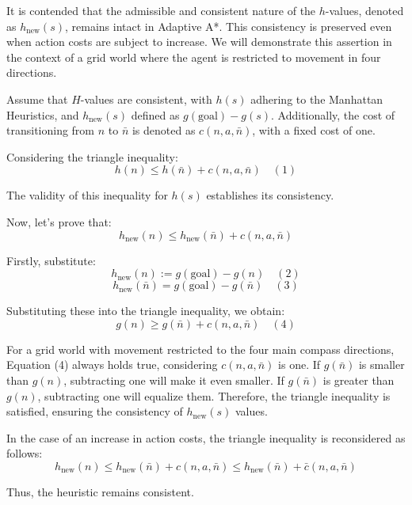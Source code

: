 It is contended that the admissible and consistent nature of the $h$-values, denoted as $h_{\text{new}}(s)$, remains intact in Adaptive A*. This consistency is preserved even when action costs are subject to increase. We will demonstrate this assertion in the context of a grid world where the agent is restricted to movement in four directions.

Assume that $H$-values are consistent, with $h(s)$ adhering to the Manhattan Heuristics, and $h_{\text{new}}(s)$ defined as $g(\text{goal}) - g(s)$. Additionally, the cost of transitioning from $n$ to $\bar{n}$ is denoted as $c(n, a, \bar{n})$, with a fixed cost of one.

Considering the triangle inequality:
\[ h(n) \leq h(\bar{n}) + c(n, a, \bar{n}) \quad (1) \]

The validity of this inequality for $h(s)$ establishes its consistency.

Now, let's prove that:
\[ h_{\text{new}}(n) \leq h_{\text{new}}(\bar{n}) + c(n, a, \bar{n}) \]

Firstly, substitute:
\[ h_{\text{new}}(n) := g(\text{goal}) - g(n) \quad (2) \]
\[ h_{\text{new}}(\bar{n}) = g(\text{goal}) - g(\bar{n}) \quad (3) \]

Substituting these into the triangle inequality, we obtain:
\[ g(n) \geq g(\bar{n}) + c(n, a, \bar{n}) \quad (4) \]

For a grid world with movement restricted to the four main compass directions, Equation (4) always holds true, considering $c(n, a, \bar{n})$ is one. If $g(\bar{n})$ is smaller than $g(n)$, subtracting one will make it even smaller. If $g(\bar{n})$ is greater than $g(n)$, subtracting one will equalize them. Therefore, the triangle inequality is satisfied, ensuring the consistency of $h_{\text{new}}(s)$ values.

In the case of an increase in action costs, the triangle inequality is reconsidered as follows:
\[ h_{\text{new}}(n) \leq h_{\text{new}}(\bar{n}) + c(n, a, \bar{n}) \leq h_{\text{new}}(\bar{n}) + \bar{c}(n, a, \bar{n}) \]

Thus, the heuristic remains consistent.